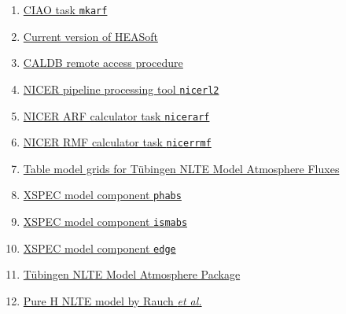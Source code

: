 \begin{enumerate}[1]
		\item \href{https://cxc.cfa.harvard.edu/ciao/ahelp/mkarf.html}{CIAO task \texttt{mkarf}}
		\item \href{https://heasarc.gsfc.nasa.gov/docs/software/heasoft/}{Current version of HEASoft}
		\item \href{https://heasarc.gsfc.nasa.gov/docs/heasarc/caldb/caldb_remote_access.html}{CALDB remote access procedure}
		\item \href{https://heasarc.gsfc.nasa.gov/lheasoft/ftools/headas/nicerl2.html}{NICER pipeline processing tool \texttt{nicerl2}}
		\item \href{https://heasarc.gsfc.nasa.gov/lheasoft/ftools/headas/nicerarf.html}{NICER ARF calculator task \texttt{nicerarf}}
		\item \href{https://heasarc.gsfc.nasa.gov/lheasoft/ftools/headas/nicerrmf.html}{NICER RMF calculator task \texttt{nicerrmf}}
		\item \href{http://astro.uni-tuebingen.de/~rauch/TMAF/TMAF.html}{Table model grids for T\"{u}bingen NLTE Model Atmosphere Fluxes}
		\item \href{https://heasarc.gsfc.nasa.gov/xanadu/xspec/manual/XSmodelPhabs.html}{XSPEC model component \texttt{phabs}}
		\item \href{https://heasarc.gsfc.nasa.gov/xanadu/xspec/manual/node255.html}{XSPEC model component \texttt{ismabs}}
		\item \href{https://heasarc.gsfc.nasa.gov/xanadu/xspec/manual/node247.html}{XSPEC model component \texttt{edge}}
		\item \href{http://astro.uni-tuebingen.de/~rauch/TMAP/TMAP.html}{T\"{u}bingen NLTE Model Atmosphere Package}
		\item \href{http://astro.uni-tuebingen.de/~rauch/TMAF/flux_H.html}{Pure H NLTE model by Rauch \textit{et al.}}
	\end{enumerate}